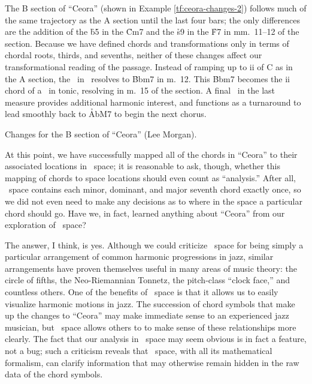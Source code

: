 The B section of ``Ceora'' (shown in Example \ref{tf:ceora-changes-2}) follows
much of the same trajectory as the A section until the last four bars; the
only differences are the addition of the \h{b5} in the \h{Cm7} and the \h{s9}
in the \h{F7} in mm.~11--12 of the section. Because we have defined chords and
transformations only in terms of chordal roots, thirds, and sevenths, neither
of these changes affect our transformational reading of the passage. Instead
of ramping up to ii of C as in the A section, the \tf\ in \Bflat\
resolves to \h{Bbm7} in m.~12. This \h{Bbm7} becomes the ii chord of a \tfo\
in tonic, resolving in m.~15 of the section. A final \tf\ in the last measure
provides additional harmonic interest, and functions as a turnaround to lead
smoothly back to \h{AbM7} to begin the next chorus.

\begin{example}[htbp]
  \caption{Changes for the B section of ``Ceora'' (Lee Morgan).}
  \label{tf:ceora-changes-2}
\end{example}

At this point, we have successfully mapped all of the chords in ``Ceora'' to
their associated locations in \tf\ space; it is reasonable to ask, though,
whether this mapping of chords to space locations should even count as
``analysis.'' After all, \tf\ space contains each minor, dominant, and major
seventh chord exactly once, so we did not even need to make any decisions as
to where in the space a particular chord should go. Have we, in fact, learned
anything about ``Ceora'' from our exploration of \tf\ space?

The answer, I think, is yes. Although we could criticize \tf\ space for being
simply a particular arrangement of common harmonic progressions in jazz,
similar arrangements have proven themselves useful in many areas of music
theory: the circle of fifths, the Neo-Riemannian Tonnetz, the pitch-class
``clock face,'' and countless others.\fn{tf-12} One of the benefits of \tf\
space is that it allows us to easily visualize harmonic motions in jazz. The
succession of chord symbols that make up the changes to ``Ceora'' may make
immediate sense to an experienced jazz musician, but \tf\ space allows others
to to make sense of these relationships more clearly. The fact that our
analysis in \tf\ space may seem obvious is in fact a feature, not a bug; such
a criticism reveals that \tf\ space, with all its mathematical formalism,
can clarify information that may otherwise remain hidden in the raw data of
the chord symbols.\fn{tf-13}

